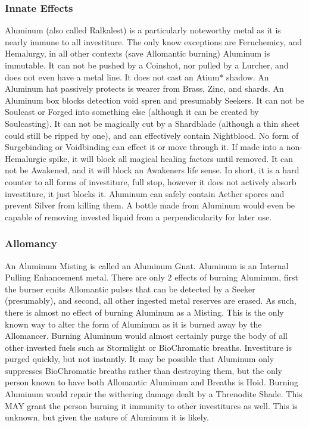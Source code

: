 \documentclass[conference]{IEEEtran}
\begin{document}
\subsubsection*{\textbf{Innate Effects}}
Aluminum (also called Ralkalest\cite{RoW-CH37}) is a particularly noteworthy metal as it is nearly immune to all investiture.\cite{al-universal}  The only know exceptions are Feruchemicy,\cite{FE-TB} and Hemalurgy,\cite{HE-TB} in all other contexts (save Allomantic burning\cite{AL-TB}) Aluminum is immutable.  It can not be pushed by a Coinshot, nor pulled by a Lurcher,\cite{ARS} and does not even have a metal line.\cite{BoM-CH6}  It does not cast an Atium* shadow.\cite{al-atium} An Aluminum hat passively protects is wearer from Brass, Zinc,\cite{AoL-CH3} and shards.\cite{al-shard}  An Aluminum box blocks detection void spren\cite{RoW-CH81} and presumably Seekers.  It can not be Soulcast\cite{al-cast} or Forged\cite{al-forged} into something else (although it can be created by Soulcasting\cite{WoR-CH48}).  It can not be magically cut by a Shardblade\cite{RoW-E17} (although a thin sheet could still be ripped by one\cite{RoW-shardblade-wob}), and can effectively contain Nightblood.\cite{al-night}  No form of Surgebinding\cite{RoW-E17}\cite{al-surge} or Voidbinding can effect it or move through it.\cite{RoW-CH37}  If made into a non-Hemalurgic spike, it will block all magical healing factors until removed.\cite{al-hf}  It can not be Awakened,\cite{al-awake} and it will block an Awakeners life sense.\cite{seeker-spren}  In short, it is a hard counter to all forms of investiture, full stop, however it does not actively absorb investiture,\cite{al-awake} it just blocks it.  Aluminum can safely contain Aether spores and prevent Silver from killing them.\cite{ToES-CH23}  A bottle made from Aluminum would even be capable of removing invested liquid from a perpendicularity for later use.\cite{al-fluid}\\\newpage
\subsubsection*{\textbf{Allomancy}}
An Aluminum Misting is called an Aluminum Gnat.\cite{ARS}  Aluminum is an Internal Pulling Enhancement metal.\cite{AL-TB}  There are only 2 effects of burning Aluminum, first the burner emits Allomantic pulses that can be detected by a Seeker (presumably),\cite{TFE-CH36} and second, all other ingested metal reserves are erased.\cite{ARS}  As such, there is almost no effect of burning Aluminum as a Misting.  This is the only known way to alter the form of Aluminum as it is burned away by the Allomancer.  Burning Aluminum would almost certainly purge the body of all other invested fuels such as Stormlight or BioChromatic breaths.  Investiture is purged quickly, but not instantly.\cite{slow-leech}  It may be possible that Aluminum only suppresses BioChromatic breaths rather than destroying them, but the only person known to have both Allomantic Aluminum and Breaths is Hoid.\cite{SH-PT2-CH1}\cite{hoid-burn}\cite{WoR-CH45}\cite{WoR-CH59} Burning Aluminum would repair the withering damage dealt by a Threnodite Shade.\cite{gl-shade} This MAY grant the person burning it immunity to other investitures as well.  This is unknown, but given the nature of Aluminum it is likely.\\
\end{document}
